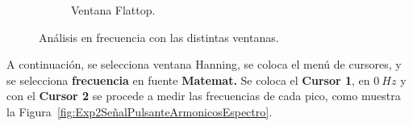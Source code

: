 \begin{figure}[H]
\begin{subfigure}[H]{0.48\textwidth}
          \caption{Ventana Flattop.}
        \end{subfigure}

        \caption{Análisis en frecuencia con las distintas ventanas.}
        \label{fig:Exp2SeñalPulsanteVentanasEspectro}
      \end{figure}

      A continuación, se selecciona ventana Hanning, se coloca el menú de cursores, y se selecciona 
      \textbf{frecuencia} en fuente 
      \textbf{Matemat.} Se coloca el \textbf{Cursor 1}, en $0~Hz$ y con el \textbf{Cursor 2} se 
      procede a medir las frecuencias de cada pico, como muestra la 
      Figura~\ref{fig:Exp2SeñalPulsanteArmonicosEspectro}.

